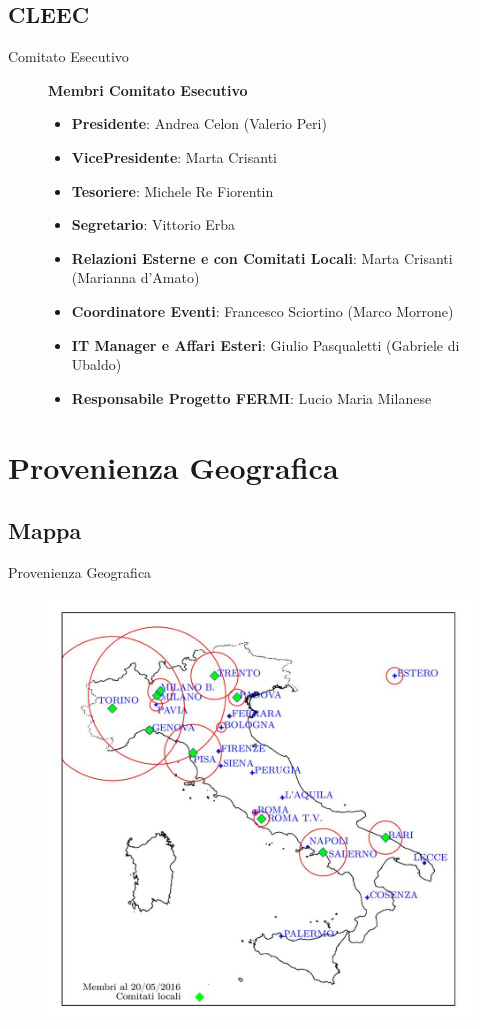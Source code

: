 \documentclass{Bredelebeamer}
\begin{document}
\subsection{CLEEC}
\begin{frame}{Comitato Esecutivo}
\begin{figure}
\begin{block}{\centering \textbf{Membri Comitato Esecutivo}}
\begin{itemize}
\item \textbf{Presidente}: Andrea Celon (Valerio Peri)
\item \textbf{VicePresidente}: Marta Crisanti
\item \textbf{Tesoriere}: Michele Re Fiorentin
\item \textbf{Segretario}: Vittorio Erba
\item \textbf{Relazioni Esterne e con Comitati Locali}: Marta Crisanti (Marianna d'Amato)
\item \textbf{Coordinatore Eventi}: Francesco Sciortino (Marco Morrone)
\item \textbf{IT Manager e Affari Esteri}: Giulio Pasqualetti (Gabriele di Ubaldo)
\item \textbf{Responsabile Progetto FERMI}: Lucio Maria Milanese
\end{itemize}
\end{block}
\end{figure}
\end{frame}
\section{Provenienza Geografica}
\subsection{Mappa}
\begin{frame}{Provenienza Geografica}
\begin{figure}
\includegraphics[scale=0.23]{images/provenienza.png}
\end{figure}
\end{frame}
\end{document}
